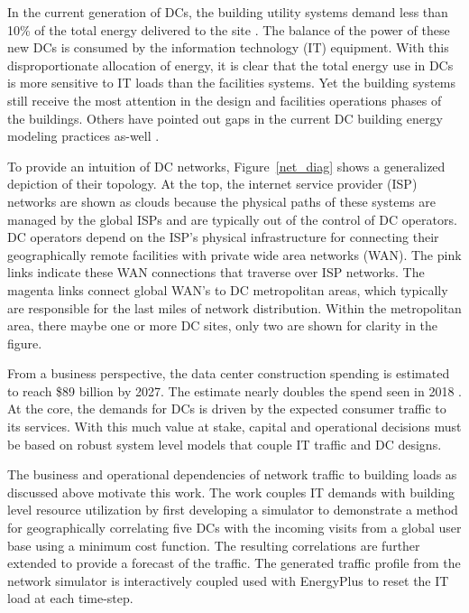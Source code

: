     In the current generation of DCs, the building utility systems demand less than 10\% of the total energy delivered to the site \cite{Shehabi16}. The balance of the power of these new DCs is consumed by the information technology (IT) equipment. With this disproportionate allocation of energy, it is clear that the total energy use in DCs is more sensitive to IT loads than the facilities systems. Yet the building systems still receive the most attention in the design and facilities operations phases of the buildings. Others have pointed out gaps in the current DC building energy modeling practices as-well \cite{Beatty15}. 
    
    To provide an intuition of DC networks, Figure~\ref{net_diag} shows a generalized depiction of their topology. At the top, the internet service provider (ISP) networks are shown as clouds because the physical paths of these systems are managed by the global ISPs and are typically out of the control of DC operators. DC operators depend on the ISP's physical infrastructure for connecting their geographically remote facilities with private wide area networks (WAN). The pink links indicate these WAN connections that traverse over ISP networks. The magenta links connect global WAN's to DC metropolitan areas, which typically are responsible for the last miles of network distribution. Within the metropolitan area, there maybe one or more DC sites, only two are shown for clarity in the figure. 
    
    
    
    From a business perspective, the data center construction spending is estimated to reach \$89 billion by 2027. The estimate nearly doubles the spend seen in 2018 \cite{dcmarket19}. At the core, the demands for DCs is driven by the expected consumer traffic to its services. With this much value at stake, capital and operational decisions must be based on robust system level models that couple IT traffic and DC designs.
    
    The business and operational dependencies of network traffic to building loads as discussed above motivate this work. The work couples IT demands with building level resource utilization by first developing a simulator to demonstrate a method for geographically correlating five DCs with the incoming visits from a global user base using a minimum cost function. The resulting correlations are further extended to provide a forecast of the traffic. The generated traffic profile from the network simulator is interactively coupled used with EnergyPlus to reset the IT load at each time-step. 
    
